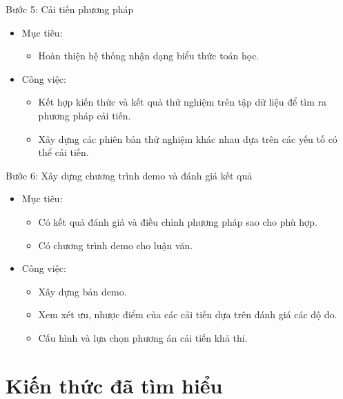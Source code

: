 \documentclass[a4paper]{article}
\theoremstyle{definition}
\begin{document}
	Bước 5: Cải tiến phương pháp
	\begin{itemize}
		\item Mục tiêu:
		\begin{itemize}
			\item Hoàn thiện hệ thống nhận dạng biểu thức toán học.
		\end{itemize}
		\item Công việc:
		\begin{itemize}
			\item Kết hợp kiến thức và kết quả thử nghiệm trên tập dữ liệu để tìm ra phương pháp cải tiến.
			\item Xây dựng các phiên bản thử nghiệm khác nhau dựa trên các yếu tố có thể cải tiến.
			
		\end{itemize}
	\end{itemize}
	Bước 6: Xây dựng chương trình demo và đánh giá kết quả
	\begin{itemize}
		\item Mục tiêu:
		\begin{itemize}
			\item Có kết quả đánh giá và điều chỉnh phương pháp sao cho phù hợp.
			\item Có chương trình demo cho luận văn.
		\end{itemize}
		\item Công việc:
		\begin{itemize}
			\item Xây dựng bản demo.
			\item Xem xét ưu, nhược điểm của các cải tiến dựa trên đánh giá các độ đo.
			\item Cấu hình và lựa chọn phương án cải tiến khả thi. 
		\end{itemize}
	\end{itemize}
	
	
	
	
	\newpage
	\section{Kiến thức đã tìm hiểu}
	
\end{document}
